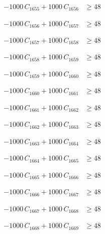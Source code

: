 \documentclass[a4paper,11pt]{article}
\begin{document}
\begin{align}
-1000\,C_{1655} + 1000\,C_{1656} &\geq 48 \nonumber
\end{align}

\begin{align}
-1000\,C_{1656} + 1000\,C_{1657} &\geq 48 \nonumber
\end{align}

\begin{align}
-1000\,C_{1657} + 1000\,C_{1658} &\geq 48 \nonumber
\end{align}

\begin{align}
-1000\,C_{1658} + 1000\,C_{1659} &\geq 48 \nonumber
\end{align}

\begin{align}
-1000\,C_{1659} + 1000\,C_{1660} &\geq 48 \nonumber
\end{align}

\begin{align}
-1000\,C_{1660} + 1000\,C_{1661} &\geq 48 \nonumber
\end{align}

\begin{align}
-1000\,C_{1661} + 1000\,C_{1662} &\geq 48 \nonumber
\end{align}

\begin{align}
-1000\,C_{1662} + 1000\,C_{1663} &\geq 48 \nonumber
\end{align}

\begin{align}
-1000\,C_{1663} + 1000\,C_{1664} &\geq 48 \nonumber
\end{align}

\begin{align}
-1000\,C_{1664} + 1000\,C_{1665} &\geq 48 \nonumber
\end{align}

\begin{align}
-1000\,C_{1665} + 1000\,C_{1666} &\geq 48 \nonumber
\end{align}

\begin{align}
-1000\,C_{1666} + 1000\,C_{1667} &\geq 48 \nonumber
\end{align}

\begin{align}
-1000\,C_{1667} + 1000\,C_{1668} &\geq 48 \nonumber
\end{align}

\begin{align}
-1000\,C_{1668} + 1000\,C_{1669} &\geq 48 \nonumber
\end{align}
\end{document}
